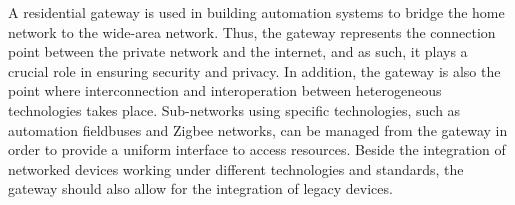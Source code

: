 \documentclass{article}
\begin{document}
\begin{itemize}
  A residential gateway is used in building automation systems to bridge the home network to the wide-area network.
  Thus, the gateway represents the connection point between the private network and the internet, and as such, it plays a crucial role in ensuring security and privacy.
  In addition, the gateway is also the point where interconnection and interoperation between heterogeneous technologies takes place.
  Sub-networks using specific technologies, such as automation fieldbuses and Zigbee networks, can be managed from the gateway in order to provide a uniform interface to access resources.
  Beside the integration of networked devices working under different technologies and standards, the gateway should also allow for the integration of legacy devices.
\end{itemize}
\end{document}
